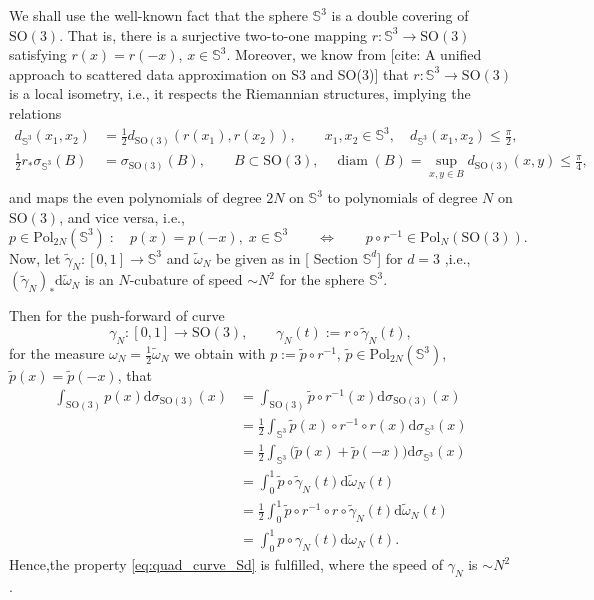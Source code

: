 \documentclass[%
a4paper,11pt,DIV=11,%
abstract=on%
]{scrartcl}
\DeclareMathOperator*{\diam}{diam}
\begin{document}
We shall use the well-known fact that the sphere $\mathbb S^{3}$ is a double covering of $\mathrm{SO(3)}$. That is, there is a surjective two-to-one mapping $r: \mathbb S^{3} \to \mathrm{SO(3)}$ satisfying $r(x) = r(-x)$, $x \in \mathbb S^{3}$. Moreover, we know from {\color{blue}[cite: A unified approach to scattered data approximation on S3 and SO(3)]}  that $r:\mathbb S^{3} \to \mathrm{SO(3)}$ is a local isometry, i.e., it respects the Riemannian structures, implying
the relations 
\[
  \begin{aligned}
    d_{\mathbb S^{3}}(x_{1},x_{2}) & = \frac{1}{2} d_{\mathrm{SO(3)}}(r(x_{1}),r(x_{2})), \qquad x_{1},x_{2} \in \mathbb S^{3}, \quad d_{\mathbb S^{3}}(x_{1},x_{2}) \le \frac{\pi}{2},\\
    \frac 12 r_{*} \sigma_{\mathbb S^{3}}(B) & =  \sigma_{\mathrm{SO(3)}}(B),\qquad B \subset \mathrm{SO(3)}, \quad \mathrm{\diam}(B) = \sup_{x,y \in B} d_{\mathrm{SO(3)}}(x,y) \le \frac{\pi}{4},\\
  \end{aligned}
\]
and maps the even polynomials of degree $2N$ on $\mathbb S^{3}$ to polynomials of degree $N$ on $\mathrm{SO(3)}$, and vice versa, i.e.,
\[
p \in \mathrm{Pol}_{2N}(\mathbb S^{3})\;: \quad p(x) = p(-x),\; x \in \mathbb S^{3}  \qquad \Leftrightarrow \qquad p \circ r^{-1} \in \mathrm{Pol}_{N}(\mathrm{SO(3)}).
\]
Now, let $\tilde \gamma_{N}:[0,1]\to \mathbb S^{3}$ and $\tilde \omega_{N}$ be given as in {[\color{blue} Section $\mathbb S^{d}$]}  for $d=3$ ,i.e., $(\tilde \gamma_{N})_{*} \mathrm d \tilde \omega_{N}$ is an $N$-cubature of speed $\sim N^{2}$ for the sphere $\mathbb S^{3}$.

Then for the push-forward of curve
\[
  \gamma_{N}:[0,1] \to \mathrm{SO(3)},\qquad \gamma_{N}(t) := r \circ  \tilde \gamma_{N}(t),
\]
for the measure $\omega_{N} = \frac12 \tilde \omega_{N}$ we obtain with $p :=\tilde p \circ r^{-1}$, $\tilde p \in \mathrm{Pol}_{2N}(\mathbb S^{3})$, $\tilde p(x)=\tilde p(-x)$, that
\[
  \begin{aligned}
  \int_{\mathrm{SO(3)}} p(x) \mathrm d \sigma_{\mathrm{SO(3)}}(x) 
& =  \int_{\mathrm{SO(3)}} \tilde p \circ r^{-1}(x) \mathrm d \sigma_{\mathrm{SO(3)}}(x) \\
&=  \frac12 \int_{\mathbb S^{3}} \tilde p (x) \circ r^{-1} \circ r (x) \mathrm d \sigma_{\mathbb S^{3}}(x) \\
&=  \frac12 \int_{\mathbb S^{3}} \big(\tilde p (x)+ \tilde p(-x)\big) \mathrm d \sigma_{\mathbb S^{3}}(x) \\
& = \int_{0}^{1} \tilde p \circ \tilde \gamma_{N} (t) \mathrm d \tilde \omega_{N}(t)\\
& = \frac12 \int_{0}^{1} \tilde p \circ r^{-1} \circ r \circ \tilde \gamma_{N} (t) \mathrm d \tilde \omega_{N}(t)\\
& = \int_{0}^{1} p \circ \gamma_{N} (t) \mathrm d \omega_{N}(t).
\end{aligned}
\]
Hence,the property \eqref{eq:quad_curve_Sd} is fulfilled, where the speed of $\gamma_{N}$ is $\sim N^{2}$.
\end{document}
